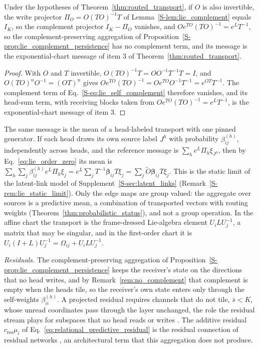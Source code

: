 \documentclass[twoside,11pt]{article}
\begin{document}
\begin{remark}[No complement]
\label{rem:no_complement}
Under the hypotheses of Theorem~\ref{thm:routed_transport}, if $O$ is also invertible, the write projector $\Pi_O=O(TO)^{-1}T$ of Lemma~\ref{S-lem:lie_complement} equals $I_K$, so the complement projector $I_K-\Pi_O$ vanishes, and $Oe^{TO}(TO)^{-1}=e^{L}T^{-1}$, so the complement-preserving aggregation of Proposition~\ref{S-prop:lie_complement_persistence} has no complement term, and its message is the exponential-chart message of item 3 of Theorem~\ref{thm:routed_transport}.
\end{remark}
\begin{proof}
With $O$ and $T$ invertible, $O(TO)^{-1}T=OO^{-1}T^{-1}T=I$, and $O(TO)^nO^{-1}=(OT)^n$ gives $Oe^{TO}(TO)^{-1}=Oe^{TO}O^{-1}T^{-1}=e^{OT}T^{-1}$. The complement term of Eq.~\eqref{S-eq:lie_self_complement} therefore vanishes, and its head-sum term, with receiving blocks taken from $Oe^{TO}(TO)^{-1}=e^{L}T^{-1}$, is the exponential-chart message of item 3.
\end{proof}

The same message is the mean of a head-labeled transport with one pinned generator. If each head draws its own source label $J^h$ with probability $\beta_{ij}^{(h)}$, independently across heads, and the reference message is $\sum_he^{L}\Pi_h\xi_{J^h}$, then by Eq.~\eqref{eq:lie_order_zero} its mean is $\sum_h\sum_j\beta_{ij}^{(h)}e^{L}\Pi_h\xi_j=e^{L}\sum_jT^{-1}\boldsymbol\beta_{ij}T\xi_j=\sum_j\widetilde O\boldsymbol\beta_{ij}T\xi_j$. This is the static limit of the latent-link model of Supplement~\ref{S-sec:latent_links} (Remark~\ref{S-rem:lie_static_limit}). Only the edge maps are group valued: the aggregate over sources is a predictive mean, a combination of transported vectors with routing weights (Theorem~\ref{thm:probabilistic_status}), and not a group operation. In the affine chart the transport is the frame-dressed Lie-algebra element $U_iLU_j^{-1}$, a matrix that may be singular, and in the first-order chart it is $U_i(I+L)U_j^{-1}=\Omega_{ij}+U_iLU_j^{-1}$.

\emph{Residuals.} The complement-preserving aggregation of Proposition~\ref{S-prop:lie_complement_persistence} keeps the receiver's state on the directions that no head writes, and by Remark~\ref{rem:no_complement} that complement is empty when the heads tile, so the receiver's own state enters only through the self-weights $\beta_{ii}^{(h)}$. A projected residual requires channels that do not tile, $\bar s<K$, whose unread coordinates pass through the layer unchanged, the role the residual stream plays for subspaces that no head reads or writes \citep{elhage2021mathematical}. The additive residual $c_{\mathrm{res}}\mu_i$ of Eq.~\eqref{eq:relational_predictive_residual} is the residual connection of residual networks \citep{He2016ResNet}, an architectural term that this aggregation does not produce.
\end{document}

